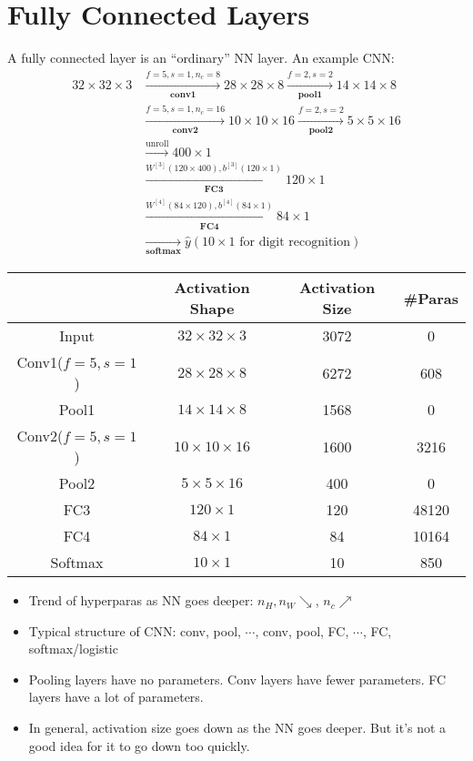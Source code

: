 \section{Fully Connected Layers}
A fully connected layer is an ``ordinary'' NN layer. An example CNN:
\begin{align*}
  32\times 32\times 3&\xrightarrow[\textbf{conv1}]{f=5,s=1,n_c=8}28\times 28\times 8\xrightarrow[\textbf{pool1}]{f=2,s=2}14\times 14\times 8\\
  &\xrightarrow[\textbf{conv2}]{f=5,s=1,n_c=16}10\times 10\times 16\xrightarrow[\textbf{pool2}]{f=2,s=2}5\times 5\times 16\\
  &\xrightarrow{\text{unroll}}400\times 1\\
  &\xrightarrow[\textbf{FC3}]{W^{[3]}(120\times 400), b^{[3]}(120\times 1)}120\times 1\\
  &\xrightarrow[\textbf{FC4}]{W^{[4]}(84\times 120), b^{[4]}(84\times 1)}84\times 1\\
  &\xrightarrow[\textbf{softmax}]{}\hat{y}(10\times 1\text{ for digit recognition})
\end{align*}
\begin{table}[ht]
  \centering
  \begin{tabular}{c|ccc}
    & Activation Shape      & Activation Size & \#Paras\\\hline
    Input   & $32\times 32\times 3$ & 3072 & 0\\
    Conv1($f=5,s=1$)   & $28\times 28\times 8$ & 6272 & 608\\
    Pool1   & $14\times 14\times 8$ & 1568 & 0\\
    Conv2($f=5,s=1$)   & $10\times 10\times 16$ & 1600 & 3216\\
    Pool2   & $5\times 5\times 16$ & 400 & 0\\
    FC3     & $120\times 1$ & 120 & 48120\\
    FC4     & $84\times 1$ & 84 & 10164\\
    Softmax & $10\times 1$ & 10 & 850\\
  \end{tabular}
\end{table}
\begin{itemize}
  \item Trend of hyperparas as NN goes deeper: $n_H,n_W\searrow$, $n_c\nearrow$
  \item Typical structure of CNN: conv, pool, $\cdots$, conv, pool, FC, $\cdots$, FC, softmax/logistic
  \item Pooling layers have no parameters. Conv layers have fewer parameters. FC layers have a lot of parameters.
  \item In general, activation size goes down as the NN goes deeper. But it's not a good idea for it to go down too quickly.
\end{itemize}
